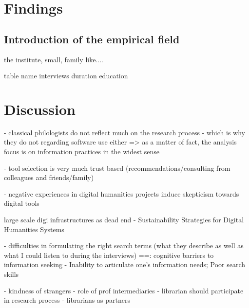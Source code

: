 \documentclass[12pt,a4paper,titlepage,oneside,abstract=true,toc=listof,toc=bibliography]{scrreprt}
\begin{document}
	
\chapter{Findings}

\section{Introduction of the empirical field}
the institute, small, family like....

table
name interviews duration education 




\chapter{Discussion}

- classical philologists do not reflect much on the research process - which is why they do not regarding software use either => as a matter of fact, the analysis focus is on information practices in the widest sense


- tool selection is very much trust based (recommendations/consulting from colleagues and friends/family)

- negative experiences in digital humanities projects induce skepticism towards digital tools

\cite{Zundert2012} large scale digi infrastructures as dead end
\cite{Neuefeind2020} - Sustainability Strategies for Digital Humanities Systems

- difficulties in formulating the right search terms (what they describe as well as what I could listen to during the interviews)
==\cite{Savolainen2015a}: cognitive barriers to information seeking - Inability to articulate one’s information needs; Poor search skills

\cite{Constant1996} - kindness of strangers
\cite{Edmond2005} - role of prof intermediaries
\cite{Gunning1978} - librarian should participate in research process
\cite{MonroeGulick2013} - librarians as partners

\end{document}
